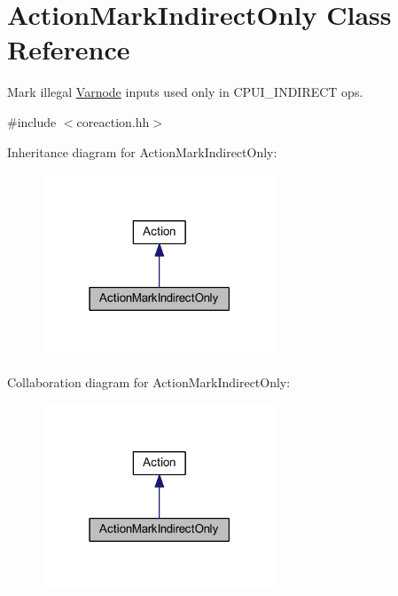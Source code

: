 \hypertarget{class_action_mark_indirect_only}{}\section{Action\+Mark\+Indirect\+Only Class Reference}
\label{class_action_mark_indirect_only}


Mark illegal \mbox{\hyperlink{class_varnode}{Varnode}} inputs used only in C\+P\+U\+I\+\_\+\+I\+N\+D\+I\+R\+E\+CT ops.  




{\ttfamily \#include $<$coreaction.\+hh$>$}



Inheritance diagram for Action\+Mark\+Indirect\+Only\+:
\nopagebreak
\begin{figure}[H]
\begin{center}
\leavevmode
\includegraphics[width=198pt]{class_action_mark_indirect_only__inherit__graph}
\end{center}
\end{figure}


Collaboration diagram for Action\+Mark\+Indirect\+Only\+:
\nopagebreak
\begin{figure}[H]
\begin{center}
\leavevmode
\includegraphics[width=198pt]{class_action_mark_indirect_only__coll__graph}
\end{center}
\end{figure}
